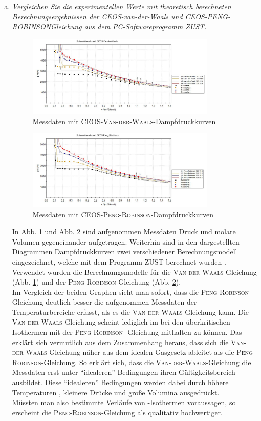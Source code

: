 \begin{enumerate}[a)]
\item \textit{Vergleichen Sie die experimentellen Werte mit theoretisch berechneten Berechnungsergebnissen der CEOS-van-der-Waals und CEOS-PENG-ROBINSONGleichung aus dem PC-Softwareprogramm ZUST.}  
\begin{figure}[h!]
\centering
\includegraphics[width=0.85\textwidth]{img/VDW}
\caption{Messdaten mit CEOS-\textsc{Van-der-Waals}-Dampfdruckkurven}
\label{fig:vdW}
\end{figure}
\FloatBarrier
\begin{figure}[h!]
	\centering
	\includegraphics[width=0.85\textwidth]{img/PR}
	\caption{Messdaten mit CEOS-\textsc{Peng-Robinson}-Dampfdruckkurven}
	\label{fig:pr}
\end{figure}
\FloatBarrier
In Abb. \ref{fig:vdW} und Abb. \ref{fig:pr} sind aufgenommen Messdaten Druck und molare Volumen gegeneinander aufgetragen. Weiterhin sind in den dargestellten Diagrammen Dampfdruckkurven zwei verschiedener Berechnungsmodell eingezeichnet, welche mit dem Programm \textsc{ZUST} berechnet wurden \cite{zust}. Verwendet wurden die Berechnungsmodelle für die \textsc{Van-der-Waals}-Gleichung (Abb. \ref{fig:vdW}) und der \textsc{Peng-Robinson}-Gleichung (Abb. \ref{fig:pr}).\\
Im Vergleich der beiden Graphen sieht man sofort, dass die \textsc{Peng-Robinson}- Gleichung deutlich besser die aufgenommen Messdaten der Temperaturbereiche erfasst, als es die \textsc{Van-der-Waals}-Gleichung kann. Die \textsc{Van-der-Waals}-Gleichung scheint lediglich im bei den überkritischen Isothermen mit der \textsc{Peng-Robinson}- Gleichung mithalten zu können. Das erklärt sich vermutlich aus dem Zusammenhang heraus, dass sich die \textsc{Van-der-Waals}-Gleichung näher aus dem idealen Gasgesetz ableitet als die \textsc{Peng-Robinson}-Gleichung. So erklärt sich, dass die \textsc{Van-der-Waals}-Gleichung die Messdaten erst unter "`idealeren"' Bedingungen ihren Gültigkeitsbereich ausbildet. Diese "`idealeren"' Bedingungen werden dabei durch höhere Temperaturen , kleinere Drücke und große Volumina ausgedrückt.\\
Müssten man also bestimmte Verläufe von -Isothermen voraussagen, so erscheint die \textsc{Peng-Robinson}-Gleichung als qualitativ hochwertiger. 


\end{enumerate}
